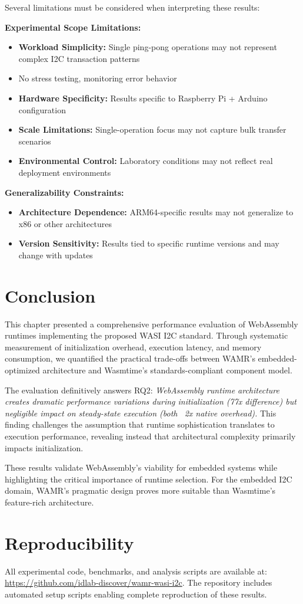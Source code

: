 Several limitations must be considered when interpreting these results:

\textbf{Experimental Scope Limitations:}
\begin{itemize}
    \item \textbf{Workload Simplicity:} Single ping-pong operations may not represent complex I2C transaction patterns
    \item No stress testing, monitoring error behavior
    \item \textbf{Hardware Specificity:} Results specific to Raspberry Pi + Arduino configuration
    \item \textbf{Scale Limitations:} Single-operation focus may not capture bulk transfer scenarios
    \item \textbf{Environmental Control:} Laboratory conditions may not reflect real deployment environments
\end{itemize}

\textbf{Generalizability Constraints:}
\begin{itemize}
    \item \textbf{Architecture Dependence:} ARM64-specific results may not generalize to x86 or other architectures
    \item \textbf{Version Sensitivity:} Results tied to specific runtime versions and may change with updates
\end{itemize}






\section{Conclusion}
\label{sec:eval-conclusion}

This chapter presented a comprehensive performance evaluation of WebAssembly runtimes implementing the proposed WASI I2C standard. Through systematic measurement of initialization overhead, execution latency, and memory consumption, we quantified the practical trade-offs between WAMR's embedded-optimized architecture and Wasmtime's standards-compliant component model.

The evaluation definitively answers RQ2: \textit{WebAssembly runtime architecture creates dramatic performance variations during initialization (77x difference) but negligible impact on steady-state execution (both ~2x native overhead).} This finding challenges the assumption that runtime sophistication translates to execution performance, revealing instead that architectural complexity primarily impacts initialization.

These results validate WebAssembly's viability for embedded systems while highlighting the critical importance of runtime selection. For the embedded I2C domain, WAMR's pragmatic design proves more suitable than Wasmtime's feature-rich architecture.

\section*{Reproducibility}
All experimental code, benchmarks, and analysis scripts are available at: \url{https://github.com/idlab-discover/wamr-wasi-i2c}. The repository includes automated setup scripts enabling complete reproduction of these results.